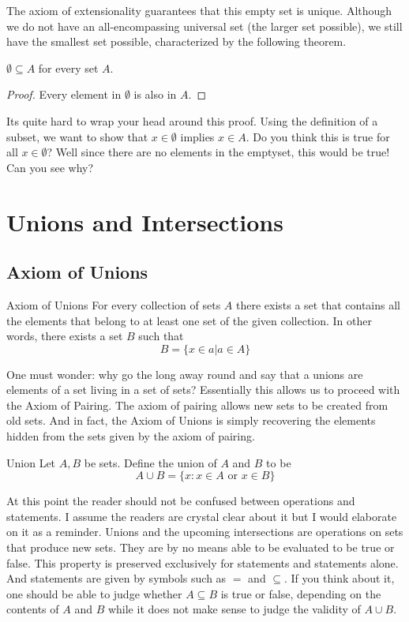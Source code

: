 The axiom of extensionality guarantees that this empty set is unique. Although we do not have an all-encompassing universal set (the larger set possible), we still have the smallest set possible, characterized by the following theorem. 

\begin{thm}{}{} $\emptyset\subseteq A$ for every set $A$. \tcbline
\begin{proof} Every element in $\emptyset$ is also in $A$. 
\end{proof}
\end{thm}

Its quite hard to wrap your head around this proof. Using the definition of a subset, we want to show that $x\in\emptyset$ implies $x\in A$. Do you think this is true for all $x\in\emptyset$? Well since there are no elements in the emptyset, this would be true! Can you see why?

\pagebreak

\section{Unions and Intersections}
\subsection{Axiom of Unions}
\begin{axm}{Axiom of Unions}{} For every collection of sets $A$ there exists a set that contains all the elements that belong to at least one set of the given collection. In other words, there exists a set $B$ such that $$B=\{x\in a|a\in A\}$$
\end{axm}

One must wonder: why go the long away round and say that a unions are elements of a set living in a set of sets? Essentially this allows us to proceed with the Axiom of Pairing. The axiom of pairing allows new sets to be created from old sets. And in fact, the Axiom of Unions is simply recovering the elements hidden from the sets given by the axiom of pairing. 

\begin{defn}{Union}{} Let $A,B$ be sets. Define the union of $A$ and $B$ to be $$A\cup B=\{x:x\in A\text{ or }x\in B\}$$
\end{defn}

At this point the reader should not be confused between operations and statements. I assume the readers are crystal clear about it but I would elaborate on it as a reminder. Unions and the upcoming intersections are operations on sets that produce new sets. They are by no means able to be evaluated to be true or false. This property is preserved exclusively for statements and statements alone. And statements are given by symbols such as $=$ and $\subseteq$. If you think about it, one should be able to judge whether $A\subseteq B$ is true or false, depending on the contents of $A$ and $B$ while it does not make sense to judge the validity of $A\cup B$. 


